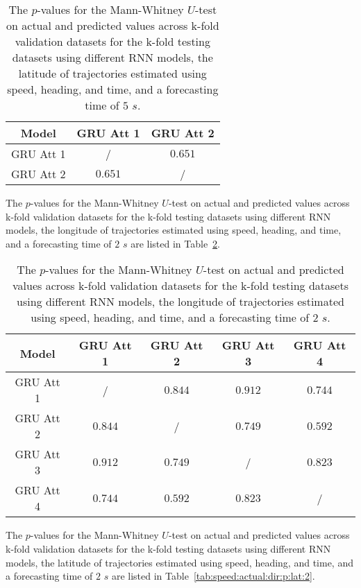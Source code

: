 \begin{table}[!ht]
	\centering
	\begin{tabular}{|c|c|c|}
		\hline
		Model & GRU Att 1 & GRU Att 2 \\ \hline
		GRU Att 1 & / & $\mathbf{0.651}$ \\ \hline
		GRU Att 2 & $\mathbf{0.651}$ & / \\ \hline
	\end{tabular}
	\caption{The $p$-values for the Mann-Whitney $U$-test on actual and predicted values across k-fold validation datasets for the k-fold testing datasets using different RNN models, the latitude of trajectories estimated using speed, heading, and time, and a forecasting time of $5$ $s$.}
	\label{tab:speed:actual:dir:p:lat:5}
\end{table}

The $p$-values for the Mann-Whitney $U$-test on actual and predicted values across k-fold validation datasets for the k-fold testing datasets using different RNN models, the longitude of trajectories estimated using speed, heading, and time, and a forecasting time of $2$ $s$ are listed in Table~\ref{tab:speed:actual:dir:p:long:2}.

\begin{table}[!ht]
	\centering
	\begin{tabular}{|c|c|c|c|c|}
		\hline
		Model & GRU Att 1 & GRU Att 2 & GRU Att 3 & GRU Att 4 \\ \hline
		GRU Att 1 & / & $\mathbf{0.844}$ & $\mathbf{0.912}$ & $\mathbf{0.744}$ \\ \hline
		GRU Att 2 & $\mathbf{0.844}$ & / & $\mathbf{0.749}$ & $\mathbf{0.592}$ \\ \hline
		GRU Att 3 & $\mathbf{0.912}$ & $\mathbf{0.749}$ & / & $\mathbf{0.823}$ \\ \hline
		GRU Att 4 & $\mathbf{0.744}$ & $\mathbf{0.592}$ & $\mathbf{0.823}$ & / \\ \hline
	\end{tabular}
	\caption{The $p$-values for the Mann-Whitney $U$-test on actual and predicted values across k-fold validation datasets for the k-fold testing datasets using different RNN models, the longitude of trajectories estimated using speed, heading, and time, and a forecasting time of $2$ $s$.}
	\label{tab:speed:actual:dir:p:long:2}
\end{table}

The $p$-values for the Mann-Whitney $U$-test on actual and predicted values across k-fold validation datasets for the k-fold testing datasets using different RNN models, the latitude of trajectories estimated using speed, heading, and time, and a forecasting time of $2$ $s$ are listed in Table~\ref{tab:speed:actual:dir:p:lat:2}.

